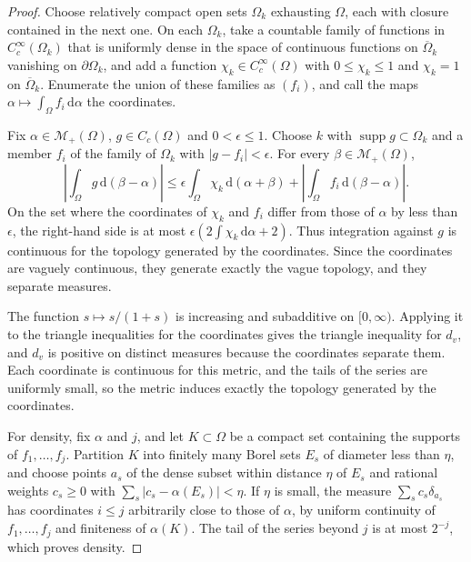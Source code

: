 \begin{proof}
Choose relatively compact open sets $\Omega_k$ exhausting $\Omega$, each with closure contained in the next one. On each $\Omega_k$, take a countable family of functions in $C_c^\infty(\Omega_k)$ that is uniformly dense in the space of continuous functions on $\overline\Omega_k$ vanishing on $\partial\Omega_k$, and add a function $\chi_k\in C_c^\infty(\Omega)$ with $0\leq\chi_k\leq1$ and $\chi_k=1$ on $\overline\Omega_k$. Enumerate the union of these families as $(f_i)$, and call the maps $\alpha\mapsto\int_\Omega f_i\,\mathrm d\alpha$ the coordinates.

Fix $\alpha\in\mathcal M_+(\Omega)$, $g\in C_c(\Omega)$ and $0<\epsilon\leq1$. Choose $k$ with $\operatorname{supp}g\subset\Omega_k$ and a member $f_i$ of the family of $\Omega_k$ with $|g-f_i|<\epsilon$. For every $\beta\in\mathcal M_+(\Omega)$,
\[
 \left|\int_\Omega g\,\mathrm d(\beta-\alpha)\right|
 \leq\epsilon\int_\Omega\chi_k\,\mathrm d(\alpha+\beta)
     +\left|\int_\Omega f_i\,\mathrm d(\beta-\alpha)\right|.
\]
On the set where the coordinates of $\chi_k$ and $f_i$ differ from those of $\alpha$ by less than $\epsilon$, the right-hand side is at most $\epsilon(2\int\chi_k\,\mathrm d\alpha+2)$. Thus integration against $g$ is continuous for the topology generated by the coordinates. Since the coordinates are vaguely continuous, they generate exactly the vague topology, and they separate measures.

The function $s\mapsto s/(1+s)$ is increasing and subadditive on $[0,\infty)$. Applying it to the triangle inequalities for the coordinates gives the triangle inequality for $d_v$, and $d_v$ is positive on distinct measures because the coordinates separate them. Each coordinate is continuous for this metric, and the tails of the series are uniformly small, so the metric induces exactly the topology generated by the coordinates.

For density, fix $\alpha$ and $j$, and let $K\subset\Omega$ be a compact set containing the supports of $f_1,\ldots,f_j$. Partition $K$ into finitely many Borel sets $E_s$ of diameter less than $\eta$, and choose points $a_s$ of the dense subset within distance $\eta$ of $E_s$ and rational weights $c_s\geq0$ with $\sum_s|c_s-\alpha(E_s)|<\eta$. If $\eta$ is small, the measure $\sum_sc_s\delta_{a_s}$ has coordinates $i\leq j$ arbitrarily close to those of $\alpha$, by uniform continuity of $f_1,\ldots,f_j$ and finiteness of $\alpha(K)$. The tail of the series beyond $j$ is at most $2^{-j}$, which proves density.
\end{proof}

